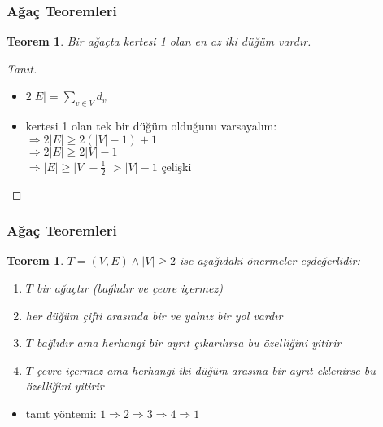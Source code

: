 \documentclass[dvipsnames]{beamer}
\theoremstyle{definition}
\theoremstyle{example}
\theoremstyle{plain}
\newtheorem{teorem}[theorem]{Teorem}
\begin{document}
\begin{frame}
  \frametitle{Ağaç Teoremleri}

  \begin{teorem}
    Bir ağaçta kertesi 1 olan en az iki düğüm vardır.
  \end{teorem}

  \pause
  \begin{proof}[Tanıt]
    \begin{itemize}
      \item $2 |E| = \sum_{v \in V} d_v$

      \pause
      \item kertesi 1 olan tek bir düğüm olduğunu varsayalım:\\
        \pause
        $\Rightarrow 2 |E| \geq 2 (|V| - 1) + 1$\\
        \pause
        $\Rightarrow 2 |E| \geq 2 |V| - 1$\\
        \pause
        $\Rightarrow |E| \geq |V| - \frac{1}{2}$
        \pause
        $> |V| - 1$ \alert{çelişki}
    \end{itemize}
  \end{proof}
\end{frame}

\begin{frame}
  \frametitle{Ağaç Teoremleri}

  \begin{teorem}
    $T = (V,E) \wedge |V| \geq 2$ ise aşağıdaki önermeler eşdeğerlidir:

    \begin{enumerate}
      \item $T$ bir ağaçtır (bağlıdır ve çevre içermez)
      \item her düğüm çifti arasında bir ve yalnız bir yol vardır
      \item $T$ bağlıdır ama herhangi bir ayrıt çıkarılırsa bu özelliğini
        yitirir
      \item $T$ çevre içermez ama herhangi iki düğüm arasına bir ayrıt eklenirse
        bu özelliğini yitirir
    \end{enumerate}
  \end{teorem}

  \pause
  \begin{itemize}
    \item tanıt yöntemi:
      $1 \Rightarrow 2 \Rightarrow 3 \Rightarrow 4 \Rightarrow 1$\\
      \hyperlink{theoremset2}{}
  \end{itemize}
\end{frame}
\end{document}

